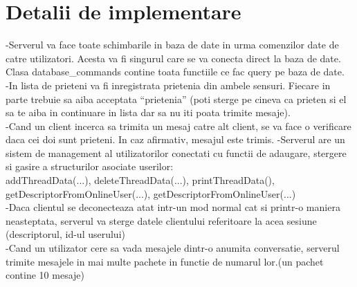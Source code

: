 \documentclass[runningheads]{llncs}
\begin{document}
\section{Detalii de implementare}
-Serverul va face toate schimbarile in baza de date in urma comenzilor date de catre utilizatori. Acesta va fi singurul care se va conecta direct la baza de date. Clasa database\_commands contine toata functiile ce fac query pe baza de date.\\
-In lista de prieteni va fi inregistrata prietenia din ambele sensuri. Fiecare in parte trebuie sa aiba acceptata “prietenia” (poti sterge pe cineva ca prieten si el sa te aiba in continuare in lista dar sa nu iti poata trimite mesaje).\\
-Cand un client incerca sa trimita un mesaj catre alt client, se va face o verificare daca cei doi sunt prieteni. In caz afirmativ, mesajul este trimis.
-Serverul are un sistem de management al utilizatorilor conectati cu functii de adaugare, stergere si gasire a structurilor asociate userilor:\\
addThreadData(...), deleteThreadData(...), printThreadData(), getDescriptorFromOnlineUser(...), getDescriptorFromOnlineUser(...)\\
-Daca clientul se deconecteaza atat intr-un mod normal cat si printr-o maniera neasteptata, serverul va sterge datele clientului referitoare la acea sesiune (descriptorul, id-ul userului)\\
-Cand un utilizator cere sa vada mesajele dintr-o anumita conversatie, serverul trimite mesajele in mai multe pachete in functie de numarul lor.(un pachet contine 10 mesaje)\\
\end{document}
